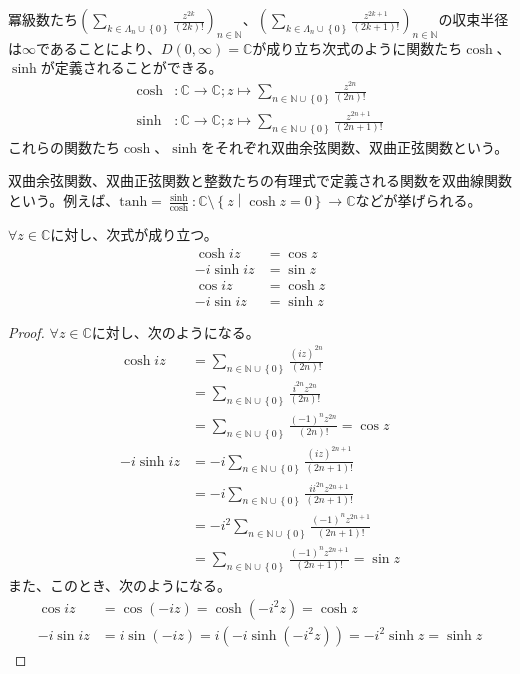 \documentclass[dvipdfmx]{jsarticle}
\begin{document}
\begin{dfn}
冪級数たち$\left( \sum_{k \in \varLambda_{n} \cup \left\{ 0 \right\}} \frac{z^{2k}}{(2k)!} \right)_{n \in \mathbb{N}}$、$\left( \sum_{k \in \varLambda_{n} \cup \left\{ 0 \right\}} \frac{z^{2k + 1}}{(2k + 1)!} \right)_{n \in \mathbb{N}}$の収束半径は$\infty$であることにより、$D(0,\infty) = \mathbb{C}$が成り立ち次式のように関数たち$\cosh$、$\sinh$が定義されることができる。
\begin{align*}
\cosh&:\mathbb{C} \rightarrow \mathbb{C};z \mapsto \sum_{n \in \mathbb{N} \cup \left\{ 0 \right\}} \frac{z^{2n}}{(2n)!}\\
\sinh&:\mathbb{C} \rightarrow \mathbb{C};z \mapsto \sum_{n \in \mathbb{N} \cup \left\{ 0 \right\}} \frac{z^{2n + 1}}{(2n + 1)!}
\end{align*}
これらの関数たち$\cosh$、$\sinh$をそれぞれ双曲余弦関数、双曲正弦関数という。
\end{dfn}
\begin{dfn}
双曲余弦関数、双曲正弦関数と整数たちの有理式で定義される関数を双曲線関数という。例えば、$\mathrm{tanh} = \frac{\sinh}{\cosh}:\mathbb{C} \setminus \left\{ z \middle| \cosh z = 0 \right\} \rightarrow \mathbb{C}$などが挙げられる。
\end{dfn}
\begin{thm}\label{4.3.1.37} $\forall z \in \mathbb{C}$に対し、次式が成り立つ。
\begin{align*}
  \cosh{iz} &= \cos z\\
  - i\sinh{iz} &= \sin z\\
  \cos{iz} &= \cosh z\\
  - i\sin{iz} &= \sinh z
\end{align*}  
\end{thm}
\begin{proof} $\forall z \in \mathbb{C}$に対し、次のようになる。
\begin{align*}
\cosh{iz} &= \sum_{n \in \mathbb{N} \cup \left\{ 0 \right\}} \frac{(iz)^{2n}}{(2n)!}\\
&= \sum_{n \in \mathbb{N} \cup \left\{ 0 \right\}} \frac{i^{2n}z^{2n}}{(2n)!}\\
&= \sum_{n \in \mathbb{N} \cup \left\{ 0 \right\}} \frac{( - 1)^{n}z^{2n}}{(2n)!} = \cos z\\
- i\sinh{iz} &= - i\sum_{n \in \mathbb{N} \cup \left\{ 0 \right\}} \frac{(iz)^{2n + 1}}{(2n + 1)!}\\
&= - i\sum_{n \in \mathbb{N} \cup \left\{ 0 \right\}} \frac{ii^{2n}z^{2n + 1}}{(2n + 1)!}\\
&= - i^{2}\sum_{n \in \mathbb{N} \cup \left\{ 0 \right\}} \frac{( - 1)^{n}z^{2n + 1}}{(2n + 1)!}\\
&= \sum_{n \in \mathbb{N} \cup \left\{ 0 \right\}} \frac{( - 1)^{n}z^{2n + 1}}{(2n + 1)!} = \sin z
\end{align*}
また、このとき、次のようになる。
\begin{align*}
\cos{iz} &= \cos( - iz) = \cosh\left( - i^{2}z \right) = \cosh z\\
- i\sin{iz} &= i\sin( - iz) = i\left( - i\sinh\left( - i^{2}z \right) \right) = - i^{2}\sinh z = \sinh z
\end{align*}
\end{proof}
\end{document}
